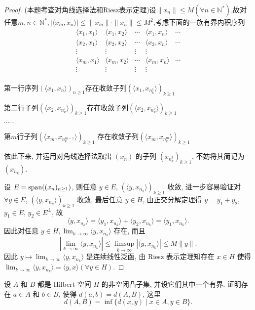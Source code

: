 \begin{proof}
  (本题考查对角线选择法和Riesz表示定理)设$\|x_n\|\leq M(\forall n\in\mathbb{N^{*}})$,故对任意$m,n\in \mathbb{N^{*}},|\langle x_m,x_n\rangle|\leq\|x_m\|\cdot\|x_n\|\leq M^2$,考虑下面的一族有界内积序列
  \[\begin{array}{ccccc}
  \langle x_1,x_1\rangle&\langle x_1,x_2\rangle&\cdots&\langle x_1,x_n\rangle&\cdots\\
  \langle x_2,x_1\rangle&\langle x_2,x_2\rangle&\cdots&\langle x_2,x_n\rangle&\cdots\\
  \vdots&\vdots&\vdots&\vdots\\
  \langle x_m,x_1\rangle&\langle x_m,x_2\rangle&\cdots&\langle x_m,x_n\rangle&\cdots\\
  \vdots&\vdots&\vdots&\vdots\\
  \end{array}\]

  第一行序列$(\langle x_1,x_n\rangle)_{n\geq 1}$存在收敛子列$(\langle x_1,x_{n_k^1}\rangle)_{k\geq 1}$

  第二行子列$(\langle x_2,x_{n_k^1}\rangle)_{k\geq 1}$存在收敛子列$(\langle x_2,x_{n_k^2}\rangle)_{k\geq 1}$

  $\cdots\cdots$

  第$m$行子列$(\langle x_m,x_{n_k^{m-1}}\rangle)_{k\geq 1}$
  存在收敛子列$(\langle x_m,x_{n_k^m}\rangle)_{k\geq 1}$
  
  依此下来, 并运用对角线选择法取出 $(x_n)$ 的子列 $(x_{n_k^k})_{k\geq 1}$,
  不妨将其简记为 $(x_{n_k})$.

  设 $E = \operatorname{span}((x_n)_{n\geq 1})$, 
  则任意 $y\in E$, $(\langle y,x_{n_k}\rangle)_{k\geq 1}$ 收敛,
  进一步容易验证对 $\forall y\in\overline{E}$, $(\langle y,x_{n_k}\rangle)_{k\geq 1}$ 收敛,
  最后任意 $y\in H$, 由正交分解定理得 $y=y_1+y_2$, $y_1\in\overline{E}$, $y_2\in E^{\perp}$, 故
  \[\langle y,x_{n_k}\rangle
    = \langle y_1,x_{n_k}\rangle+\langle y_2,x_{n_k}\rangle=\langle y_1,x_{n_k}\rangle.\]
  因此对任意 $y\in H,\lim_{k\to\infty}\langle y,x_{n_k}\rangle$ 存在, 而且
  \[\left|\lim_{k\to\infty}\langle y,x_{n_k}\rangle\right|\leq\limsup_{k\to\infty}|\langle y,x_{n_k}\rangle|\leq M\|y\|.\]
  因此 $y\mapsto\lim_{k\to\infty}\langle y,x_{n_k}\rangle$ 是连续线性泛函, 
  由 Riesz 表示定理知存在 $x\in H$ 使得 $\lim_{k\to\infty}\langle y,x_{n_k}\rangle=\langle y,x\rangle(\forall y\in H)$.
\end{proof}


\begin{exercise}
  设 $A$ 和 $B$ 都是 Hilbert 空间 $H$ 的非空闭凸子集,
  并设它们其中一个有界. 证明存在 $a\in A$ 和 $b\in B$,
  使得 $d(a,b)=d(A,B)$, 这里
  \[d(A,B)=\inf\{d(x,y)\mid x\in A, y\in B\}.\]
\end{exercise}

